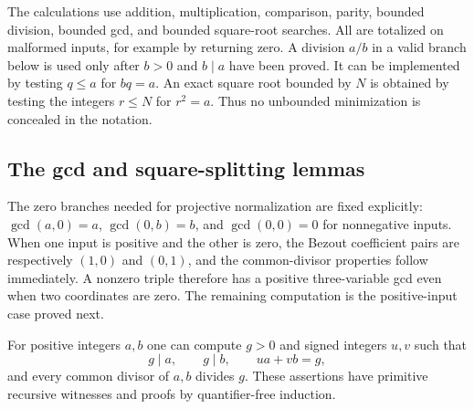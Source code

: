 The calculations use addition, multiplication, comparison, parity, bounded
division, bounded gcd, and bounded square-root searches.  All are totalized
on malformed inputs, for example by returning zero.  A division $a/b$ in a
valid branch below is used only after $b>0$ and $b\mid a$ have been proved.
It can be implemented by testing $q\leq a$ for $bq=a$.  An exact square
root bounded by $N$ is obtained by testing the integers $r\leq N$ for
$r^2=a$.  Thus no unbounded minimization is concealed in the notation.

\subsection{The gcd and square-splitting lemmas}

The zero branches needed for projective normalization are fixed explicitly:
$\gcd(a,0)=a$, $\gcd(0,b)=b$, and $\gcd(0,0)=0$ for nonnegative
inputs. When one input is positive and the other is zero, the Bezout
coefficient pairs are respectively $(1,0)$ and $(0,1)$, and the
common-divisor properties follow immediately. A nonzero triple therefore
has a positive three-variable gcd even when two coordinates are zero.
The remaining computation is the positive-input case proved next.

\begin{lemma}\label{lem:fq-gcd}
For positive integers $a,b$ one can compute $g>0$ and signed integers
$u,v$ such that
\[
 g\mid a,\qquad g\mid b,\qquad ua+vb=g,
\]
and every common divisor of $a,b$ divides $g$.  These assertions have
primitive recursive witnesses and proofs by quantifier-free induction.
\end{lemma}

